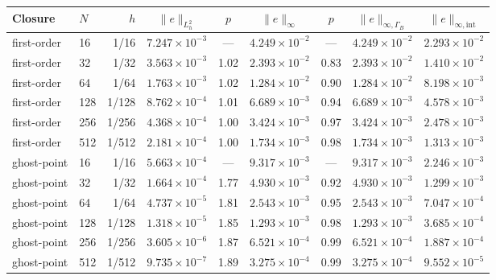 \begin{tabular}{@{}llrcccccc@{}}\toprule
Closure & $N$ & $h$ & $\|e\|_{L^2_h}$ & $p$ & $\|e\|_{\infty}$ & $p$ & $\|e\|_{\infty,\Gamma_B}$ & $\|e\|_{\infty,\mathrm{int}}$\\\midrule
first-order & 16 & 1/16 & $7.247\times10^{-3}$ & --- & $4.249\times10^{-2}$ & --- & $4.249\times10^{-2}$ & $2.293\times10^{-2}$\\
first-order & 32 & 1/32 & $3.563\times10^{-3}$ & 1.02 & $2.393\times10^{-2}$ & 0.83 & $2.393\times10^{-2}$ & $1.410\times10^{-2}$\\
first-order & 64 & 1/64 & $1.763\times10^{-3}$ & 1.02 & $1.284\times10^{-2}$ & 0.90 & $1.284\times10^{-2}$ & $8.198\times10^{-3}$\\
first-order & 128 & 1/128 & $8.762\times10^{-4}$ & 1.01 & $6.689\times10^{-3}$ & 0.94 & $6.689\times10^{-3}$ & $4.578\times10^{-3}$\\
first-order & 256 & 1/256 & $4.368\times10^{-4}$ & 1.00 & $3.424\times10^{-3}$ & 0.97 & $3.424\times10^{-3}$ & $2.478\times10^{-3}$\\
first-order & 512 & 1/512 & $2.181\times10^{-4}$ & 1.00 & $1.734\times10^{-3}$ & 0.98 & $1.734\times10^{-3}$ & $1.313\times10^{-3}$\\
\midrule
ghost-point & 16 & 1/16 & $5.663\times10^{-4}$ & --- & $9.317\times10^{-3}$ & --- & $9.317\times10^{-3}$ & $2.246\times10^{-3}$\\
ghost-point & 32 & 1/32 & $1.664\times10^{-4}$ & 1.77 & $4.930\times10^{-3}$ & 0.92 & $4.930\times10^{-3}$ & $1.299\times10^{-3}$\\
ghost-point & 64 & 1/64 & $4.737\times10^{-5}$ & 1.81 & $2.543\times10^{-3}$ & 0.95 & $2.543\times10^{-3}$ & $7.047\times10^{-4}$\\
ghost-point & 128 & 1/128 & $1.318\times10^{-5}$ & 1.85 & $1.293\times10^{-3}$ & 0.98 & $1.293\times10^{-3}$ & $3.685\times10^{-4}$\\
ghost-point & 256 & 1/256 & $3.605\times10^{-6}$ & 1.87 & $6.521\times10^{-4}$ & 0.99 & $6.521\times10^{-4}$ & $1.887\times10^{-4}$\\
ghost-point & 512 & 1/512 & $9.735\times10^{-7}$ & 1.89 & $3.275\times10^{-4}$ & 0.99 & $3.275\times10^{-4}$ & $9.552\times10^{-5}$\\
\bottomrule
\end{tabular}
